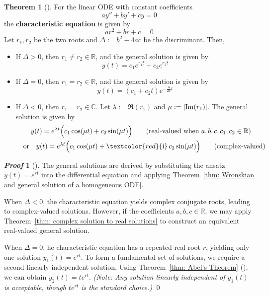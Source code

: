 \documentclass[10pt,UTF8]{article}
\newenvironment{theoremBox}
{
  \begin{tcolorbox}[colback=yellow!5!white,colframe=yellow!75!black,parbox=false,before
  upper=\par,before lower=\par]}
  {
\end{tcolorbox}}
\theoremstyle{definition}
\newtheorem{definition inner}{Definition}[section]
\theoremstyle{definition}
\newtheorem{theorem inner}{Theorem}[section]
\newenvironment{theorem}[1][]
{
  \begin{theoremBox}
  \begin{theorem inner}[#1]\hfill\par}
    {
    \end{theorem inner}
\end{theoremBox}}
\theoremstyle{definition}
\newtheorem*{proof inner}{\textit{Proof}}
\renewenvironment{proof}[1][]
{
\begin{proof inner}[#1]\hfill\par}
  {\qed\vphantom{.}
\end{proof inner}}
\theoremstyle{plain}
\newtheorem{tip inner}{Tip}[section]
\theoremstyle{remark}
\newcommand{\iu}{\mathrm{i}}  %
\begin{document}
\begin{theorem}
  For the linear ODE with constant coefficients
  \begin{equation}
    a y'' + b y' + c y = 0
  \end{equation}
  the \textbf{characteristic equation} is given by
  \begin{equation*}
    a r^2 + b r + c = 0
  \end{equation*}
  Let \(r_1, r_2\) be the two roots and \(\Delta := b^2 - 4 a c\)
  be the discriminant. Then,
  \begin{itemize}
    \item If \(\Delta > 0\), then \(r_1 \neq r_2 \in \mathbb{R}\),
      and the general solution is given by
      \begin{equation*}
        y(t) = c_1 e^{r_1 t} + c_2 e^{r_2 t}
      \end{equation*}
    \item If \(\Delta = 0\), then \(r_1 = r_2 \in \mathbb{R}\),
      and the general solution is given by
      \begin{equation*}
        y(t) = (c_1 + c_2 t) e^{-\frac{b}{2 a} t}
      \end{equation*}
    \item If \(\Delta < 0\), then \(r_1 = \overline{r_2} \in \mathbb{C}\).
      Let \(\lambda := \Re(r_1)\) and \(\mu := \abs{\Im(r_1)}\).
      The general solution is given by
      \begin{gather*}
        y(t) = e^{\lambda t} \Big(
          c_1 \cos(\mu t) + c_2 \sin(\mu t)
        \Big)
        \qquad \text{(real-valued when \(a,b,c,c_1,c_2\in\mathbb{R}\))} \\
        \qor
        y(t) = e^{\lambda t} \Big(
          c_1 \cos(\mu t) + \textcolor{red}{\iu}\, c_2 \sin(\mu t)
        \Big)
        \qquad \text{(complex-valued)}
      \end{gather*}
  \end{itemize}
\end{theorem}

\begin{proof}
  The general solutions are derived by substituting
  the ansatz \( y(t) = e^{rt} \) into the differential equation
  and applying
  Theorem~\ref{thm: Wronskian and general solution of a homogeneous ODE}.

  When \(\Delta < 0\),
  the characteristic equation yields complex conjugate roots,
  leading to complex-valued solutions.
  However, if the coefficients \( a, b, c \in \mathbb{R} \),
  we may apply Theorem~\ref{thm: complex solution to real solutions}
  to construct an equivalent real-valued general solution.

  When \(\Delta = 0\),
  he characteristic equation has a repeated real root \( r \),
  yielding only one solution \( y_1(t) = e^{rt} \).
  To form a fundamental set of solutions,
  we require a second linearly independent solution.
  Using Theorem~\ref{thm: Abel's Theorem} (),
  we can obtain \( y_2(t) = t e^{rt} \).
  \textit{(Note: Any solution linearly independent of \( y_1(t) \) is
  acceptable, though \( t e^{rt} \) is the standard choice.)}
\end{proof}
\end{document}
